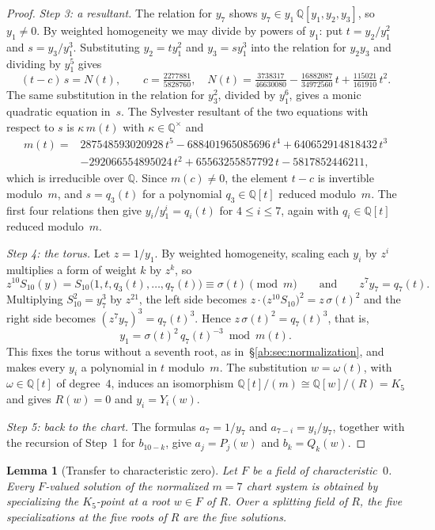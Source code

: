 \documentclass[a4paper,11pt]{article}
\theoremstyle{jsplain}
\newtheorem{lemma}[theorem]{Lemma}
\theoremstyle{jsdef}
\theoremstyle{jsrem}
\begin{document}
\begin{proof}
\emph{Step 3: a resultant.} The relation for $y_7$ shows $y_7\in y_1\,\mathbb{Q}[y_1,y_2,y_3]$, so $y_1\neq0$. By weighted homogeneity we may divide by powers of $y_1$: put $t=y_2/y_1^2$ and $s=y_3/y_1^3$. Substituting $y_2=ty_1^2$ and $y_3=sy_1^3$ into the relation for $y_2y_3$ and dividing by $y_1^5$ gives
\[
(t-c)\,s=N(t),\qquad c=\tfrac{2277881}{5828760},\quad N(t)=\tfrac{3738317}{46630080}-\tfrac{16882087}{34972560}\,t+\tfrac{115021}{161910}\,t^2 .
\]
The same substitution in the relation for $y_3^2$, divided by $y_1^6$, gives a monic quadratic equation in~$s$. The Sylvester resultant of the two equations with respect to $s$ is $\kappa\,m(t)$ with $\kappa\in\mathbb{Q}^\times$ and
\[
\begin{aligned}
m(t)={}&287548593020928\,t^5-688401965085696\,t^4+640652914818432\,t^3\\
&-292066554895024\,t^2+65563255857792\,t-5817852446211,
\end{aligned}
\]
which is irreducible over $\mathbb{Q}$. Since $m(c)\neq0$, the element $t-c$ is invertible modulo~$m$, and $s=q_3(t)$ for a polynomial $q_3\in\mathbb{Q}[t]$ reduced modulo~$m$. The first four relations then give $y_i/y_1^i=q_i(t)$ for $4\le i\le 7$, again with $q_i\in\mathbb{Q}[t]$ reduced modulo~$m$.

\emph{Step 4: the torus.} Let $z=1/y_1$. By weighted homogeneity, scaling each $y_i$ by $z^i$ multiplies a form of weight $k$ by $z^k$, so
\[
z^{10}S_{10}(y)=S_{10}\bigl(1,t,q_3(t),\dots,q_7(t)\bigr)\equiv\sigma(t)\pmod m\qquad\text{and}\qquad z^7y_7=q_7(t).
\]
Multiplying $S_{10}^2=y_7^3$ by $z^{21}$, the left side becomes $z\cdot\bigl(z^{10}S_{10}\bigr)^2=z\,\sigma(t)^2$ and the right side becomes $(z^7y_7)^3=q_7(t)^3$. Hence $z\,\sigma(t)^2=q_7(t)^3$, that is,
\[
y_1=\sigma(t)^2\,q_7(t)^{-3}\bmod m(t).
\]
This fixes the torus without a seventh root, as in~\S\ref{ab:sec:normalization}, and makes every $y_i$ a polynomial in $t$ modulo~$m$. The substitution $w=\omega(t)$, with $\omega\in\mathbb{Q}[t]$ of degree~$4$, induces an isomorphism $\mathbb{Q}[t]/(m)\cong\mathbb{Q}[w]/(R)=K_5$ and gives $R(w)=0$ and $y_i=Y_i(w)$.

\emph{Step 5: back to the chart.} The formulas $a_7=1/y_7$ and $a_{7-i}=y_i/y_7$, together with the recursion of Step~1 for $b_{10-k}$, give $a_j=P_j(w)$ and $b_k=Q_k(w)$.
\end{proof}

\begin{lemma}[Transfer to characteristic zero]\label{ab:lem:chart-transfer}
Let $F$ be a field of characteristic~$0$. Every $F$-valued solution of the normalized $m=7$ chart system is obtained by specializing the $K_5$-point at a root $w\in F$ of $R$. Over a splitting field of $R$, the five specializations at the five roots of $R$ are the five solutions.
\end{lemma}
\end{document}
